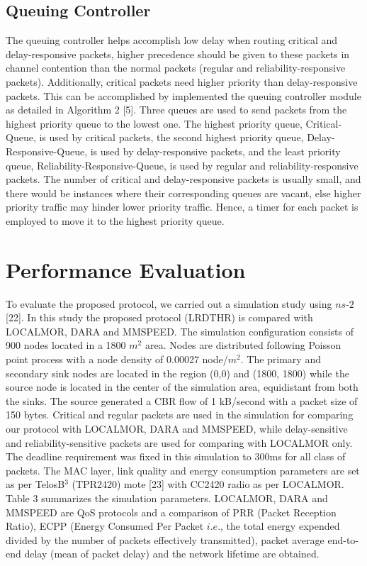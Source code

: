 \documentclass[fleqn,twoside]{article}
\begin{document}
\subsection{Queuing Controller}
The queuing controller helps accomplish low delay when routing critical and delay-responsive packets, higher precedence 
should be given to these packets in channel contention than the normal packets (regular and reliability-responsive packets). 
Additionally, critical packets need higher priority than delay-responsive
packets. This can be accomplished by implemented the queuing controller
module as detailed in Algorithm 2 [5]. Three queues are used to send packets from the highest priority queue to the lowest one. 
The highest priority queue, Critical-Queue, is used by critical packets, the second highest priority queue, Delay-Responsive-Queue,
is used by delay-responsive packets, and the least priority queue,
Reliability-Responsive-Queue, is used by regular and reliability-responsive packets. The
number of critical and delay-responsive packets is usually small, and there would be instances where their corresponding queues
are vacant, else higher priority traffic may hinder lower priority traffic.
Hence, a timer for each packet is employed to move it to the highest priority queue.

 \section{Performance Evaluation}

To evaluate the proposed protocol, we carried out a simulation study using $ns$-$2$ [22]. In this study the proposed protocol 
(LRDTHR) is compared with LOCALMOR, DARA and MMSPEED. The simulation configuration consists of 900 nodes 
located in a 1800 $m^2$ area. Nodes are distributed following Poisson point process with a node density of 0.00027 node/$m^2$. The 
primary and secondary sink nodes are located in the region (0,0) and (1800, 1800) while the source node is located in the center
of the simulation area, equidistant from both the sinks. The source generated a CBR flow of 1 kB/second with a packet size of 
150 bytes. Critical and regular packets are used in the simulation for comparing our protocol with LOCALMOR, DARA and MMSPEED, 
while delay-sensitive and reliability-sensitive packets are used for comparing with LOCALMOR only. The deadline requirement was 
fixed in this simulation to 300ms for all class of packets.
\vskip 2mm
The MAC layer, link quality and energy consumption parameters are
set as per TelosB$^{3}$ (TPR2420) mote [23] with CC2420 radio as per LOCALMOR. Table 3 summarizes the simulation parameters.
LOCALMOR, DARA and MMSPEED are QoS protocols and a comparison of PRR (Packet Reception Ratio), 
ECPP (Energy Consumed Per Packet $i.e.$, the total energy expended divided by the number of packets effectively transmitted), 
packet average end-to-end delay (mean of packet delay) and the network lifetime are obtained.
\end{document}
